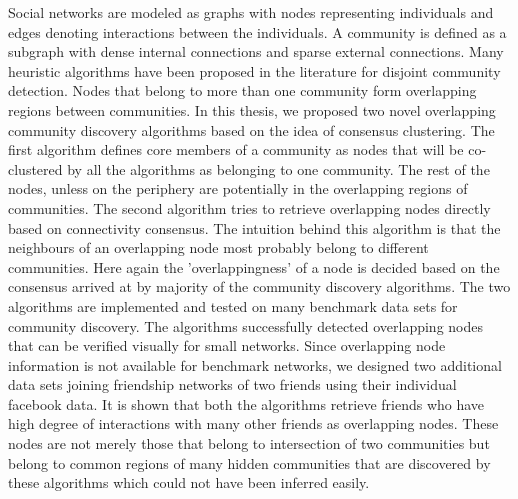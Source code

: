 Social networks are modeled as graphs with nodes representing individuals and edges denoting interactions between the individuals. 
A community is defined as a subgraph with dense internal connections and sparse external connections. Many heuristic algorithms have been proposed 
in the literature for disjoint community detection. Nodes that belong to more than one community form overlapping regions between communities. 
In this thesis, we proposed two novel overlapping community discovery algorithms based on the idea of consensus clustering. The first algorithm  
defines core members of  a community as  nodes that will be  co-clustered by all the algorithms as belonging to one community. The rest of the nodes,
unless on the periphery are potentially in the overlapping regions of communities. The second algorithm tries to retrieve overlapping nodes directly 
based on connectivity consensus. The intuition behind this algorithm is that the neighbours of an overlapping node most probably belong to  different 
communities. Here again the 'overlappingness' of a node is decided based on the consensus arrived at by majority of the community discovery algorithms. 
The two algorithms are implemented and tested on many benchmark data sets for community discovery. The algorithms successfully detected overlapping nodes 
that can be verified visually for small networks. Since overlapping node information is not available for benchmark networks, we designed two  additional 
data sets joining friendship networks of two friends using their individual facebook  data. It is shown that both the algorithms retrieve friends who have 
high degree of interactions with many other friends as overlapping nodes. These nodes are not merely those that belong to intersection of two communities 
but belong to common regions of many hidden communities that are discovered by these algorithms which could not have been inferred easily.

